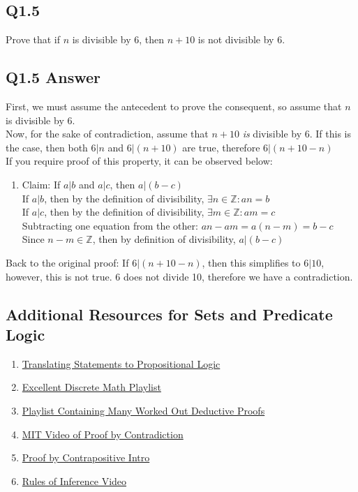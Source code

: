 \documentclass{article}
\begin{document}
\subsection*{Q1.5}
Prove that if $n$ is divisible by 6, then $n+10$ is not divisible by 6.
\newpage
\subsection*{Q1.5 Answer}
First, we must assume the antecedent to prove the consequent, so assume that $n$ is divisible by 6.
\\ Now, for the sake of contradiction, assume that $n+10$ \textit{is} divisible by 6. If this is the case, then both $6|n$ and $6|(n+10)$ are true, therefore $6|(n+10-n)$
\\ If you require proof of this property, it can be observed below:
\begin{enumerate}[label=]
\item Claim: If $a|b$ and $a|c$, then $a|(b-c)$
\\ If $a|b$, then by the definition of divisibility, $\exists n\in\mathbb{Z}:an=b$
\\ If $a|c$, then by the definition of divisibility, $\exists m\in\mathbb{Z}:am=c$
\\ Subtracting one equation from the other: $an-am=a(n-m)=b-c$
\\ Since $n-m\in\mathbb{Z}$, then by definition of divisibility, $a|(b-c)$
\end{enumerate}
Back to the original proof: If $6|(n+10-n)$, then this simplifies to $6|10$, however, this is not true. 6 does not divide 10, therefore we have a contradiction.
\newpage

\subsection*{Additional Resources for Sets and Predicate Logic}
\begin{enumerate}
    \item \href{https://www.youtube.com/watch?v=A2k3ulOJ3u4}{Translating Statements to Propositional Logic} 
    \item \href{https://www.youtube.com/watch?v=A3Ffwsnad0k&list=PLl-gb0E4MII28GykmtuBXNUNoej-vY5Rz}{Excellent Discrete Math Playlist}
    \item \href{https://www.youtube.com/watch?v=6o1kLNEE-d4&list=PLF_J2w5w0Z3E7jZGz-23P6WrKxokXBkHC}{Playlist Containing Many Worked Out Deductive Proofs}
    \item \href{https://www.youtube.com/watch?v=CpW0ZJ7i0oc}{MIT Video of Proof by Contradiction}
    \item \href{https://www.youtube.com/watch?v=0YqZIHFmVzg}{Proof by Contrapositive Intro}
    \item \href{https://www.youtube.com/watch?v=8DW0K3mnc-0}{Rules of Inference Video}
\end{enumerate}
\newpage
\end{document}
